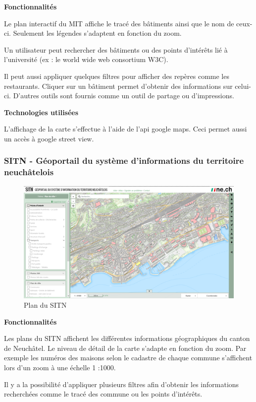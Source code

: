 \documentclass[
    iai, %
    il, %
]{heig-tb}
\begin{document}
\textbf{Fonctionnalités}

Le plan interactif du MIT \cite{mit-map} affiche le tracé des bâtiments ainsi que le nom de ceux-ci. Seulement les légendes s'adaptent en fonction du zoom.

Un utilisateur peut rechercher des bâtiments ou des points d'intérêts lié à l'université (ex : le world wide web consortium W3C).

Il peut aussi appliquer quelques filtres pour afficher des repères comme les restaurants. Cliquer sur un bâtiment permet d'obtenir des informations sur celui-ci. D'autres outils sont fournis comme un outil de partage ou d'impressions.

\textbf{Technologies utilisées}

L'affichage de la carte s'effectue à l'aide de l'api google maps. Ceci permet aussi un accès à google street view.

\subsubsection{SITN - Géoportail du système d'informations du territoire neuchâtelois}

\begin{figure}[h]
    \centering
    \includegraphics[scale=0.7]{planSITN.png}
    \caption{Plan du SITN}
\end{figure}

\textbf{Fonctionnalités}

Les plans du SITN \cite{sitn} affichent les différentes informations géographiques du canton de Neuchâtel.
Le niveau de détail de la carte s'adapte en fonction du zoom.
Par exemple les numéros des maisons selon le cadastre de chaque commune s'affichent lors d'un zoom à une échelle 1 :1000.

Il y a la possibilité d'appliquer plusieurs filtres afin d'obtenir les informations recherchées comme le tracé des commune ou les points d'intérêts.
\end{document}
